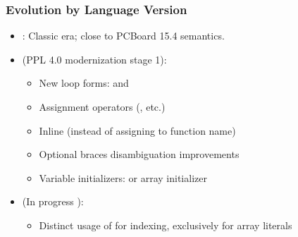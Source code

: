 \documentclass[letterpaper,10pt,english]{sphinxmanual}
\begin{document}
\subsubsection{Evolution by Language Version}
\label{\detokenize{ppl:evolution-by-language-version}}\begin{itemize}
\item {} 
\sphinxAtStartPar
{}: Classic era; close to PCBoard 15.4 semantics.

\item {} 
\sphinxAtStartPar
{} (PPL 4.0 modernization stage 1):
\begin{itemize}
\item {} 
\sphinxAtStartPar
New loop forms:  and 

\item {} 
\sphinxAtStartPar
Assignment operators (, etc.)

\item {} 
\sphinxAtStartPar
Inline  (instead of assigning to function name)

\item {} 
\sphinxAtStartPar
Optional braces disambiguation improvements

\item {} 
\sphinxAtStartPar
Variable initializers:  or array initializer 

\end{itemize}

\item {} 
\sphinxAtStartPar
{} (In progress \textendash{} ):
\begin{itemize}
\item {} 
\sphinxAtStartPar
Distinct usage of  for indexing,  exclusively for array literals


\end{itemize}
\end{itemize}
\end{document}
